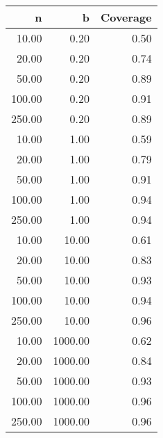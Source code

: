 
\begin{tabular}{rrr}
  \hline
n & b & Coverage \\ 
  \hline
10.00 & 0.20 & 0.50 \\ 
  20.00 & 0.20 & 0.74 \\ 
  50.00 & 0.20 & 0.89 \\ 
  100.00 & 0.20 & 0.91 \\ 
  250.00 & 0.20 & 0.89 \\ 
  10.00 & 1.00 & 0.59 \\ 
  20.00 & 1.00 & 0.79 \\ 
  50.00 & 1.00 & 0.91 \\ 
  100.00 & 1.00 & 0.94 \\ 
  250.00 & 1.00 & 0.94 \\ 
  10.00 & 10.00 & 0.61 \\ 
  20.00 & 10.00 & 0.83 \\ 
  50.00 & 10.00 & 0.93 \\ 
  100.00 & 10.00 & 0.94 \\ 
  250.00 & 10.00 & 0.96 \\ 
  10.00 & 1000.00 & 0.62 \\ 
  20.00 & 1000.00 & 0.84 \\ 
  50.00 & 1000.00 & 0.93 \\ 
  100.00 & 1000.00 & 0.96 \\ 
  250.00 & 1000.00 & 0.96 \\ 
   \hline
\end{tabular}